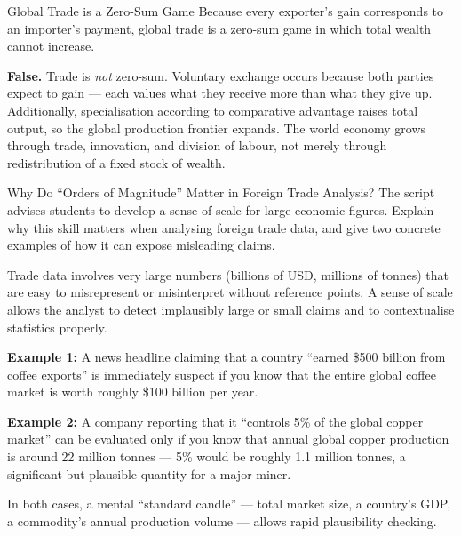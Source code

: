 \documentclass[paper=a5]{scrartcl}
\begin{document}
\begin{question}[type=tf]{Global Trade is a Zero-Sum Game}
Because every exporter's gain corresponds to an importer's payment, global
trade is a zero-sum game in which total wealth cannot increase.
\truefalse[false]
\begin{solution}
  \textbf{False.} Trade is \emph{not} zero-sum. Voluntary exchange occurs
  because both parties expect to gain --- each values what they receive more
  than what they give up. Additionally, specialisation according to comparative
  advantage raises total output, so the global production frontier expands.
  The world economy grows through trade, innovation, and division of labour,
  not merely through redistribution of a fixed stock of wealth.
\end{solution}
\end{question}

\begin{question}[type=open]{Why Do ``Orders of Magnitude'' Matter in Foreign Trade
  Analysis?}
The script advises students to develop a sense of scale for large economic
figures. Explain why this skill matters when analysing foreign trade data,
and give two concrete examples of how it can expose misleading claims.

\answerlines[6]

\begin{solution}
  Trade data involves very large numbers (billions of USD, millions of tonnes)
  that are easy to misrepresent or misinterpret without reference points.
  A sense of scale allows the analyst to detect implausibly large or small
  claims and to contextualise statistics properly.

  \textbf{Example 1:} A news headline claiming that a country ``earned
  \$500 billion from coffee exports'' is immediately suspect if you know that
  the entire global coffee market is worth roughly \$100 billion per year.

  \textbf{Example 2:} A company reporting that it ``controls 5\% of the
  global copper market'' can be evaluated only if you know that annual global
  copper production is around 22 million tonnes --- 5\% would be roughly
  1.1 million tonnes, a significant but plausible quantity for a major miner.

  In both cases, a mental ``standard candle'' --- total market size, a
  country's GDP, a commodity's annual production volume --- allows rapid
  plausibility checking.
\end{solution}
\end{question}
\end{document}
